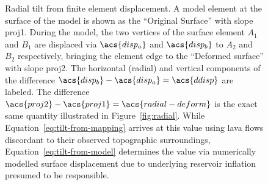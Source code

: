 \begin{figure}
    
    \caption[Calculation of \acf{radial-deform} from modelling]{Radial tilt from finite element displacement. A model element at the surface of the model is shown as the ``Original Surface'' with slope \acs{proj1}. During the model, the two vertices of the surface element $A_1$ and $B_1$ are displaced via $\acs{disp_a}$ and $\acs{disp_b}$ to $A_2$ and $B_2$ respectively, bringing the element edge to the ``Deformed surface'' with slope \acs{proj2}. The horizontal (radial) and vertical components of the difference $\acs{disp_b} - \acs{disp_a} = \acs{ddisp}$ are labeled. The difference $\acs{proj2}-\acs{proj1}=\acs{radial-deform}$ is the exact same quantity illustrated in Figure~\ref{fig:radial}. While Equation~\eqref{eq:tilt-from-mapping} arrives at this value using lava flows discordant to their observed topographic surroundings, Equation~\eqref{eq:tilt-from-model} determines the value via numerically modelled surface displacement due to underlying reservoir inflation presumed to be responsible.}
    \label{fig:tilt-from-model}
\end{figure}

